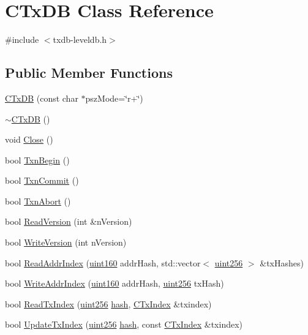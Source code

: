 \hypertarget{class_c_tx_d_b}{}\section{C\+Tx\+D\+B Class Reference}
\label{class_c_tx_d_b}


{\ttfamily \#include $<$txdb-\/leveldb.\+h$>$}

\subsection*{Public Member Functions}
\begin{DoxyCompactItemize}
\item 
\hyperlink{class_c_tx_d_b_a15efd656b7f86b0abf8d99183cae493a}{C\+Tx\+D\+B} (const char $\ast$psz\+Mode=\char`\"{}r+\char`\"{})
\item 
\hyperlink{class_c_tx_d_b_a279b844a6669e94680c95c2f2bf45580}{$\sim$\+C\+Tx\+D\+B} ()
\item 
void \hyperlink{class_c_tx_d_b_ad319e9c15a7a03b9b80d7affb7fb655e}{Close} ()
\item 
bool \hyperlink{class_c_tx_d_b_af3c27c5cb8f922b5c03840feda844016}{Txn\+Begin} ()
\item 
bool \hyperlink{class_c_tx_d_b_aff04f078df2fc3640d559ce62fc9a6a2}{Txn\+Commit} ()
\item 
bool \hyperlink{class_c_tx_d_b_ac984bce763c97af6fd90f3056367b521}{Txn\+Abort} ()
\item 
bool \hyperlink{class_c_tx_d_b_a24938c7578577c08b2a3eae7617dfa1e}{Read\+Version} (int \&n\+Version)
\item 
bool \hyperlink{class_c_tx_d_b_aa30dbf235b1c229896097e1eb1ea9520}{Write\+Version} (int n\+Version)
\item 
bool \hyperlink{class_c_tx_d_b_af1a1c0835bf9eb9a59e9d197678b0a4d}{Read\+Addr\+Index} (\hyperlink{classuint160}{uint160} addr\+Hash, std\+::vector$<$ \hyperlink{classuint256}{uint256} $>$ \&tx\+Hashes)
\item 
bool \hyperlink{class_c_tx_d_b_aa661acc6807641aa0b27c41864c3102c}{Write\+Addr\+Index} (\hyperlink{classuint160}{uint160} addr\+Hash, \hyperlink{classuint256}{uint256} tx\+Hash)
\item 
bool \hyperlink{class_c_tx_d_b_a8a138e5dcc3ef98991abaa16eaa8ddeb}{Read\+Tx\+Index} (\hyperlink{classuint256}{uint256} \hyperlink{cache_8cc_a11ecb029164e055f28f4123ce3748862}{hash}, \hyperlink{class_c_tx_index}{C\+Tx\+Index} \&txindex)
\item 
bool \hyperlink{class_c_tx_d_b_a62fb371022854dc8cb247bed36302df2}{Update\+Tx\+Index} (\hyperlink{classuint256}{uint256} \hyperlink{cache_8cc_a11ecb029164e055f28f4123ce3748862}{hash}, const \hyperlink{class_c_tx_index}{C\+Tx\+Index} \&txindex)

\end{DoxyCompactItemize}
